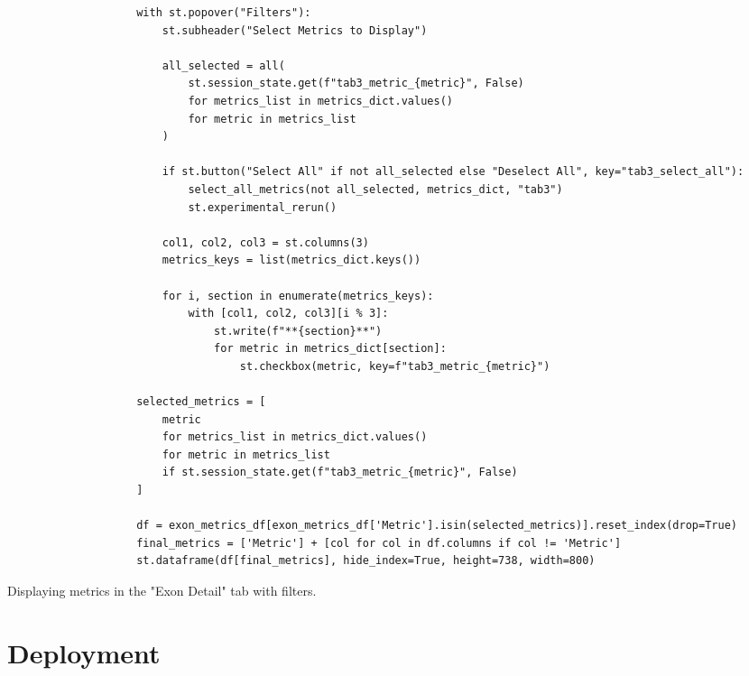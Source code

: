 \begin{longlisting}
\begin{verbatim}
                    with st.popover("Filters"):
                        st.subheader("Select Metrics to Display")

                        all_selected = all(
                            st.session_state.get(f"tab3_metric_{metric}", False)
                            for metrics_list in metrics_dict.values()
                            for metric in metrics_list
                        )

                        if st.button("Select All" if not all_selected else "Deselect All", key="tab3_select_all"):
                            select_all_metrics(not all_selected, metrics_dict, "tab3")
                            st.experimental_rerun()

                        col1, col2, col3 = st.columns(3)
                        metrics_keys = list(metrics_dict.keys())

                        for i, section in enumerate(metrics_keys):
                            with [col1, col2, col3][i % 3]:
                                st.write(f"**{section}**")
                                for metric in metrics_dict[section]:
                                    st.checkbox(metric, key=f"tab3_metric_{metric}")

                    selected_metrics = [
                        metric
                        for metrics_list in metrics_dict.values()
                        for metric in metrics_list
                        if st.session_state.get(f"tab3_metric_{metric}", False)
                    ]

                    df = exon_metrics_df[exon_metrics_df['Metric'].isin(selected_metrics)].reset_index(drop=True)
                    final_metrics = ['Metric'] + [col for col in df.columns if col != 'Metric']
                    st.dataframe(df[final_metrics], hide_index=True, height=738, width=800)
\end{verbatim}
\caption{Displaying metrics in the "Exon Detail" tab with filters.}
\label{lbl:results11}
\end{longlisting}





\section{Deployment}
